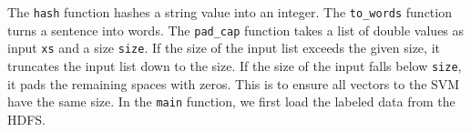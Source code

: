 \documentclass[10pt]{article}
\begin{document}
The {\tt hash} function hashes a string value into an integer.
The {\tt to\_words} function turns a sentence into words.
The {\tt pad\_cap} function takes a list of double values as input {\tt xs} and
a size {\tt size}. If the size of the input
list exceeds the given size, it truncates the input list down to the size.
If the size of the input falls below {\tt size}, it pads the remaining spaces with zeros.
This is to ensure all vectors to the SVM have the same size.
In the {\tt main} function, we first load the labeled data from the HDFS.
\end{document}
